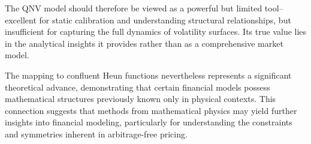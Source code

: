 \documentclass[a4paper,11pt]{article}
\begin{document}
The QNV model should therefore be viewed as a powerful but limited tool--excellent for static calibration and understanding structural relationships, but insufficient for capturing the full dynamics of volatility surfaces. Its true value lies in the analytical insights it provides rather than as a comprehensive market model.

The mapping to confluent Heun functions nevertheless represents a significant theoretical advance, demonstrating that certain financial models possess mathematical structures previously known only in physical contexts. This connection suggests that methods from mathematical physics may yield further insights into financial modeling, particularly for understanding the constraints and symmetries inherent in arbitrage-free pricing.

\end{document}
